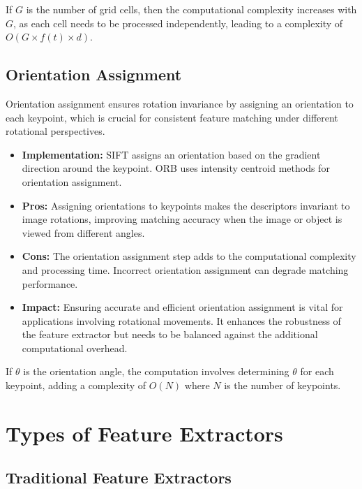 If $G$ is the number of grid cells, then the computational complexity increases with $G$, as each cell needs to be processed independently, leading to a complexity of $O(G \times f(t) \times d)$.

\subsection{Orientation Assignment}
Orientation assignment ensures rotation invariance by assigning an orientation to each keypoint, which is crucial for consistent feature matching under different rotational perspectives.
\begin{itemize}
    \item \textbf{Implementation:} SIFT assigns an orientation based on the gradient direction around the keypoint. ORB uses intensity centroid methods for orientation assignment.
    \item \textbf{Pros:} Assigning orientations to keypoints makes the descriptors invariant to image rotations, improving matching accuracy when the image or object is viewed from different angles.
    \item \textbf{Cons:} The orientation assignment step adds to the computational complexity and processing time. Incorrect orientation assignment can degrade matching performance.
    \item \textbf{Impact:} Ensuring accurate and efficient orientation assignment is vital for applications involving rotational movements. It enhances the robustness of the feature extractor but needs to be balanced against the additional computational overhead.
\end{itemize}

If $\theta$ is the orientation angle, the computation involves determining $\theta$ for each keypoint, adding a complexity of $O(N)$ where $N$ is the number of keypoints.

\section{Types of Feature Extractors}
\subsection{Traditional Feature Extractors}
